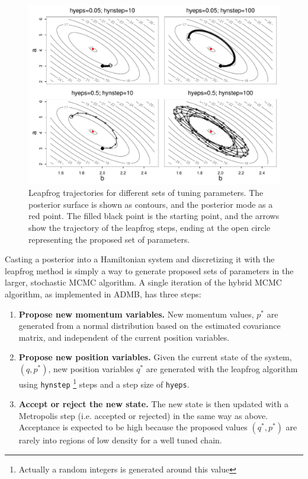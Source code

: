 \documentclass{article}\usepackage[]{graphicx}\usepackage[]{color}
\begin{document}
\begin{figure}[h]
  \centering
  \includegraphics[width=5in]{../plots/hybrid_grid_trace.pdf}
  \caption{Leapfrog trajectories for different sets of
    tuning parameters. The posterior surface is shown as
    contours, and the posterior mode as a red point. The
    filled black point is the starting point, and the arrows
    show the trajectory of the leapfrog steps, ending at the
    open circle representing the proposed set of
    parameters.}
  \label{fig:hybrid_grid_trace}
\end{figure}

Casting a posterior into a Hamiltonian system and
discretizing it with the leapfrog method is simply a way to
generate proposed sets of parameters in the larger,
stochastic MCMC algorithm. A single iteration of the hybrid
MCMC algorithm, as implemented in ADMB, has three steps:
\begin{enumerate}
\item \textbf{Propose new momentum variables.} New momentum
  values, $p^*$ are generated from a normal distribution
  based on the estimated covariance matrix, and independent
  of the current position variables.
\item \textbf{Propose new position variables.} Given the
  current state of the system, $(q,p^*)$, new position
  variables $q^*$ are generated with the leapfrog algorithm
  using \texttt{hynstep} \footnote{Actually a random
    integers is generated around this value} steps and a
  step size of \texttt{hyeps}.
\item \textbf{Accept or reject the new state.} The new state
  is then updated with a Metropolis step (i.e. accepted or
  rejected) in the same way as above. Acceptance is expected
  to be high because the proposed values $(q^*, p^*)$ are
  rarely into regions of low density for a well tuned chain.
\end{enumerate}
\end{document}
